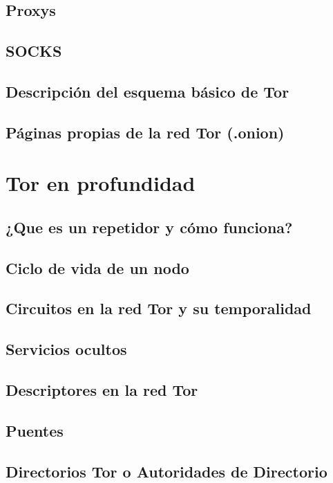 \documentclass[a4paper,twocolumn,10pt]{article}
\begin{document}
\subsection{Proxys}

\subsection{SOCKS}

\subsection{Descripción del esquema básico de Tor}

\subsection{Páginas propias de la red Tor (.onion)}


\newpage


\section{Tor en profundidad}
\subsection{¿Que es un repetidor y cómo funciona?}

\subsection{Ciclo de vida de un nodo}

\subsection{Circuitos en la red Tor y su temporalidad}

\subsection{Servicios ocultos}

\subsection{Descriptores en la red Tor}

\subsection{Puentes}

\subsection{Directorios Tor o Autoridades de Directorio}

\end{document}

